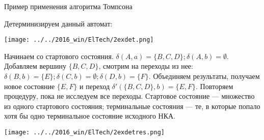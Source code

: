 \documentclass[12pt]{article}
\begin{document}
{\newpage

\begin{center} \Large{Пример применения алгоритма Томпсона}
\end{center}

\bigskip

Детерминизируем данный автомат: 

\texttt{[image: ../../2016\_win/ElTech/2exdet.png]}

Начинаем со стартового состояния. $\delta(A, a) = \{B, C, D\}; \delta(A, b) = \emptyset$. Добавляем вершину $\{B, C, D\}$, смотрим на переходы из нее: $\delta(B, b) = \{E\}; \delta(C, b) = \emptyset; \delta(D, b) = \{ F\}$. Объединяем результаты, получаем новое состояние $\{ E, F\}$ и переход $\delta'(\{B,C,D\}, b) = \{E, F\}$. Повторяем процедуру, пока не исследуем все переходы. Стартовое состояние --- множество из одного стартового состояния; терминальные состояния --- те, в которые попало хотя бы одно терминальное состояние исходного НКА.

\texttt{[image: ../../2016\_win/ElTech/2exdetres.png]}



}
\end{document}
